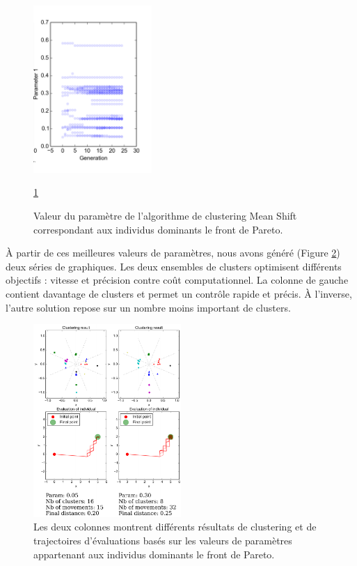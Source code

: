 \documentclass{llncs}
\begin{document}
\begin{figure}[ht]
  \begin{center}
  \includegraphics[width=0.4\textwidth]{figures/Pareto_front.pdf}
    \caption{Valeur du paramètre de l'algorithme de clustering Mean Shift correspondant aux individus dominants le front de Pareto.}
  \ref{fig4}
  \label{fig4}
  \end{center}
\end{figure}

\`A partir de ces meilleures valeurs de paramètres, nous avons généré (Figure \ref{fig6}) deux séries de graphiques. Les deux ensembles de clusters optimisent différents objectifs : vitesse et précision contre coût computationnel. La colonne de gauche contient davantage de clusters et permet un contrôle rapide et précis. \`A l'inverse, l'autre solution repose sur un nombre moins important de clusters.

\begin{figure}[ht]
  \begin{center}
  \includegraphics[width=0.5\textwidth]{figures/Benchmark_3.pdf}
  \caption{Les deux colonnes montrent différents résultats de clustering et de trajectoires d'évaluations basés sur les valeurs de paramètres appartenant aux individus dominants le front de Pareto.}
  \label{fig6}
  \end{center}
\end{figure}
\end{document}
